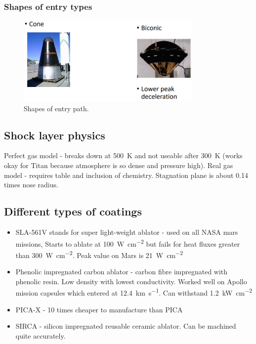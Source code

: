\subsubsection{Shapes of entry types}
\begin{figure}[H]
    \centering
    \includegraphics[width =0.8\textwidth]{img/figure39.png}
    \caption{Shapes of entry path.}
\end{figure}
\subsection{Shock layer physics}
Perfect gas model - breaks down at \SI{500}{\kelvin} and not useable after \SI{300}{\kelvin} (works okay for Titan because atmosphere is so dense and pressure high). Real gas model - requires table and inclusion of chemistry. Stagnation plane is about 0.14 times nose radius.
\subsection{Different types of coatings}
\begin{itemize}
    \item SLA-561V stands for super light-weight ablator - used on all NASA mars missions, Starts to ablate at \SI{100}{\watt\per\centi\meter\squared} but fails for heat fluxes greater than \SI{300}{\watt\per\centi\meter\squared}. Peak value on Mars is \SI{21}{\watt\per\centi\meter\squared}
    \item Phenolic impregnated carbon ablator - carbon fibre impregnated with phenolic resin. Low density with lowest conductivity. Worked well on Apollo mission capsules which entered at \SI{12.4}{\kilo\meter\per\second}. Can withstand \SI{1.2}{\kilo\watt\per\centi\meter\squared}
    \item PICA-X - 10 times cheaper to manufacture than PICA
    \item SIRCA - silicon impregnated reusable ceramic ablator. Can be machined quite accurately.
\end{itemize}
